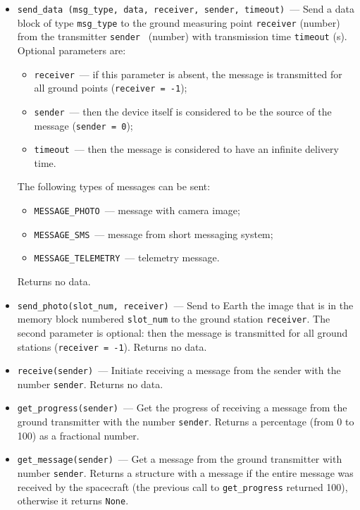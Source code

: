 \documentclass[12pt,a4paper]{article}
\begin{document}
\begin{itemize}
\item \verb'send_data (msg_type, data, receiver, sender, timeout)'~--- Send a data block of type \verb'msg_type' to the ground measuring point \verb'receiver' (number) from the transmitter \verb'sender ' (number) with transmission time \verb'timeout' (s). Optional parameters are:

\begin{itemize}
\item \verb'receiver'~--- if this parameter is absent, the message is transmitted for all ground points (\verb'receiver = -1');
\item \verb'sender'~--- then the device itself is considered to be the source of the message (\verb'sender = 0');
\item \verb'timeout'~--- then the message is considered to have an infinite delivery time.
\end{itemize}

The following types of messages can be sent:

\begin{itemize}
\item \verb'MESSAGE_PHOTO'~--- message with camera image;
\item \verb'MESSAGE_SMS'~--- message from short messaging system;
\item \verb'MESSAGE_TELEMETRY'~--- telemetry message.
\end{itemize}

Returns no data.
\item \verb'send_photo(slot_num, receiver)'~--- Send to Earth the image that is in the memory block numbered \verb'slot_num' to the ground station \verb'receiver'. The second parameter is optional: then the message is transmitted for all ground stations (\verb'receiver = -1'). Returns no data.
\item \verb'receive(sender)'~--- Initiate receiving a message from the sender with the number \verb'sender'. Returns no data.
\item \verb'get_progress(sender)'~--- Get the progress of receiving a message from the ground transmitter with the number \verb'sender'. Returns a percentage (from 0 to 100) as a fractional number.
\item \verb'get_message(sender)'~--- Get a message from the ground transmitter with number \verb'sender'. Returns a structure with a message if the entire message was received by the spacecraft (the previous call to \verb'get_progress' returned 100), otherwise it returns \verb'None'.
\end{itemize}
\end{document}
